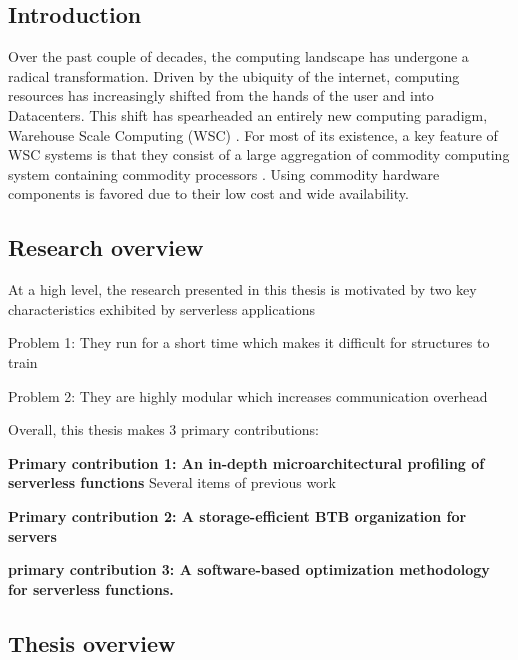 \documentclass[../main.tex]{subfiles}
\begin{document}
\ifx\chapincluded\undefined
  \begin{refsection}
 \fi


\chapter{Introduction}

Over the past couple of decades, the computing landscape has undergone a radical transformation. Driven by the ubiquity of the internet, computing resources has increasingly shifted from the hands of the user and into Datacenters. This shift has spearheaded an entirely new computing paradigm, Warehouse Scale Computing (WSC) \cite{barroso18_datac_as_comput}. For most of its existence, a key feature of WSC systems is that they consist of a large aggregation of commodity computing system containing commodity processors \cite{barroso03_web_searc_planet}. Using commodity hardware components is favored due to their low cost and wide availability.  \cite{ noferdman12_clear_cloud,}


\section{Research overview}

At a high level, the research presented in this thesis is motivated by two key characteristics exhibited by serverless applications

Problem 1: They run for a short time which makes it difficult for structures to train

Problem 2: They are highly modular which increases communication overhead

Overall, this thesis makes 3 primary contributions:

\vspace*{0.5cm}

\noindent
\textbf{Primary contribution 1: An in-depth microarchitectural profiling of serverless functions}
Several items of previous work 

\vspace*{0.5cm}

\noindent
\textbf{Primary contribution 2: A storage-efficient BTB organization for servers}

\vspace*{0.5cm}

\noindent
\textbf{primary contribution 3: A software-based optimization methodology for serverless functions.}

\section{Thesis overview}


\ifx\chapincluded\undefined
  \printbibliography
  \end{refsection}
 \fi
\end{document}
